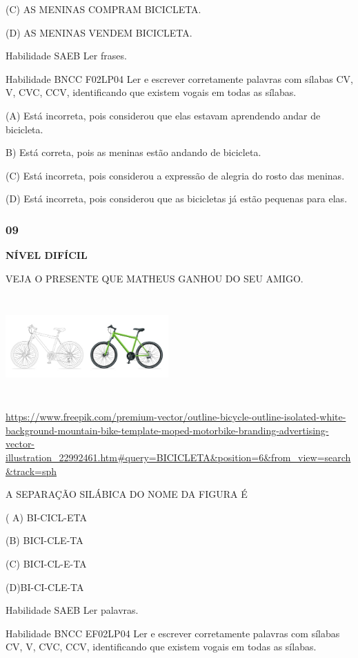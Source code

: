 (C) AS MENINAS COMPRAM BICICLETA.

(D\protect\hypertarget{_Hlk129513580}{}{}) AS MENINAS VENDEM BICICLETA.

Habilidade SAEB Ler frases.

Habilidade BNCC F02LP04 Ler e escrever corretamente palavras com sílabas
CV, V, CVC, CCV, identificando que existem vogais em todas as sílabas.

(A) Está incorreta, pois considerou que elas estavam aprendendo andar de
bicicleta.

B) Está correta, pois as meninas estão andando de bicicleta.

(C) Está incorreta, pois considerou a expressão de alegria do rosto das
meninas.

(D) Está incorreta, pois considerou que as bicicletas já estão pequenas
para elas.

\subsubsection{09}\label{section-151}

\textbf{NÍVEL DIFÍCIL}

VEJA O PRESENTE QUE MATHEUS GANHOU DO SEU AMIGO.

\includegraphics[width=2.46250in,height=1.54444in]{media/image180.jpeg}

\url{https://www.freepik.com/premium-vector/outline-bicycle-outline-isolated-white-background-mountain-bike-template-moped-motorbike-branding-advertising-vector-illustration_22992461.htm\#query=BICICLETA\&position=6\&from_view=search\&track=sph}

A SEPARAÇÃO SILÁBICA DO NOME DA FIGURA É

( A) BI-CICL-ETA

(B) BICI-CLE-TA

(C) BICI-CL-E-TA

(D)BI-CI-CLE-TA

Habilidade SAEB Ler palavras.

Habilidade BNCC EF02LP04 Ler e escrever corretamente palavras com
sílabas CV, V, CVC, CCV, identificando que existem vogais em todas as
sílabas.

